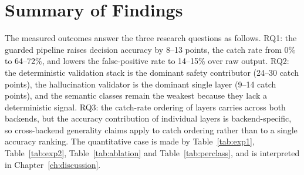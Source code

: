\section{Summary of Findings}\label{sec:summary-findings}

The measured outcomes answer the three research questions as follows. RQ1:
the guarded pipeline raises decision accuracy by 8--13 points, the catch rate
from 0\% to 64--72\%, and lowers the false-positive rate to 14--15\% over raw
output. RQ2: the deterministic validation stack is the dominant safety
contributor (24--30 catch points), the hallucination validator is the dominant
single layer (9--14 catch points), and the semantic classes remain the weakest
because they lack a deterministic signal. RQ3: the catch-rate ordering of
layers carries across both backends, but the accuracy contribution of
individual layers is backend-specific, so cross-backend generality claims
apply to catch ordering rather than to a single accuracy ranking. The
quantitative case is made by Table~\ref{tab:exp1}, Table~\ref{tab:exp2},
Table~\ref{tab:ablation} and Table~\ref{tab:perclass}, and is interpreted in
Chapter~\ref{ch:discussion}.